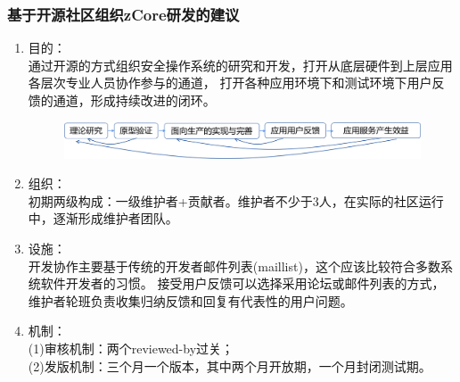 \documentclass[
8pt, %
]{beamer}
\begin{document}
	\begin{frame}
		\frametitle{基于开源社区组织zCore研发的建议}
		\begin{enumerate}
			\item 目的：\\
			通过开源的方式组织安全操作系统的研究和开发，打开从底层硬件到上层应用各层次专业人员协作参与的通道，
			打开各种应用环境下和测试环境下用户反馈的通道，形成持续改进的闭环。
			\begin{figure}
				\includegraphics[width=1.0\linewidth]{open_community.png}
			\end{figure}
			\item 组织：\\
			初期两级构成：一级维护者+贡献者。维护者不少于3人，在实际的社区运行中，逐渐形成维护者团队。
			\item 设施：\\
			开发协作主要基于传统的开发者邮件列表(maillist)，这个应该比较符合多数系统软件开发者的习惯。
			接受用户反馈可以选择采用论坛或邮件列表的方式，维护者轮班负责收集归纳反馈和回复有代表性的用户问题。
			\item 机制：\\
			(1)审核机制：两个reviewed-by过关；\\
			(2)发版机制：三个月一个版本，其中两个月开放期，一个月封闭测试期。
		\end{enumerate}
	\end{frame}
\end{document}
